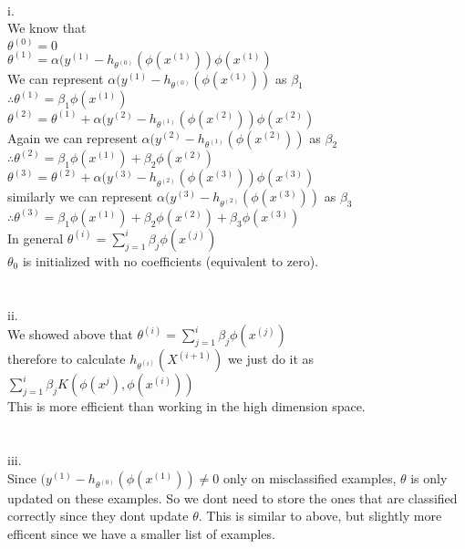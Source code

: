 \begin{answer}\\
i.\\
We know that\\
$\theta^{(0)}=0$\\
$\theta^{(1)}=\alpha(y^{(1)}-h_{\theta^{(0)}}(\phi(x^{(1)}))\phi(x^{(1)})$\\
We can represent $\alpha(y^{(1)}-h_{\theta^{(0)}}(\phi(x^{(1)}))$ as $\beta_1$\\
$\therefore \theta^{(1)}=\beta_1 \phi(x^{(1)})$\\
$\theta^{(2)}=\theta^{(1)}+\alpha(y^{(2)}-h_{\theta^{(1)}}(\phi(x^{(2)}))\phi(x^{(2)})$\\
Again we can represent $\alpha(y^{(2)}-h_{\theta^{(1)}}(\phi(x^{(2)}))$ as $\beta_2$\\
$\therefore \theta^{(2)}=\beta_1 \phi(x^{(1)})+\beta_2 \phi(x^{(2)})$\\
$\theta^{(3)}=\theta^{(2)}+\alpha(y^{(3)}-h_{\theta^{(2)}}(\phi(x^{(3)}))\phi(x^{(3)})$\\
similarly we can represent $\alpha(y^{(3)}-h_{\theta^{(2)}}(\phi(x^{(3)}))$ as $\beta_3$\\
$\therefore \theta^{(3)}=\beta_1 \phi(x^{(1)})+\beta_2 \phi(x^{(2)})+\beta_3 \phi(x^{(3)})$\\
In general $\theta^{(i)}=\sum_{j=1}^{i}\beta_j \phi(x^{(j)})$\\
$\theta_0$ is initialized with no coefficients (equivalent to zero).\\
\\
\\
ii.\\
We showed above that $\theta^{(i)}=\sum_{j=1}^{i}\beta_j \phi(x^{(j)})$\\
therefore to calculate $h_{\theta^{(i)}}(X^{(i+1)})$ we just do it as $\sum_{j=1}^{i}\beta_j K(\phi(x^{j}),\phi(x^{(i)}))$\\
This is more efficient than working in the high dimension space.\\
\\
\\
iii. \\
Since $(y^{(1)}-h_{\theta^{(0)}}(\phi(x^{(1)})) \neq 0$ only on misclassified examples, $\theta$ is only updated on these examples. So we dont need to store the ones that are classified correctly since they dont update $\theta$. This is similar to above, but slightly more efficent since we have a smaller list of examples.
\end{answer}
